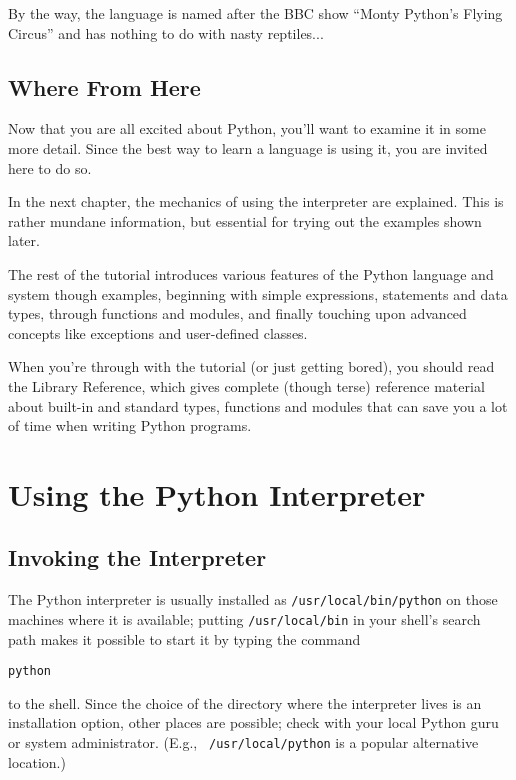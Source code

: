 By the way, the language is named after the BBC show ``Monty
Python's Flying Circus'' and has nothing to do with nasty reptiles...

\section{Where From Here}

Now that you are all excited about Python, you'll want to examine it
in some more detail.  Since the best way to learn a language is
using it, you are invited here to do so.

In the next chapter, the mechanics of using the interpreter are
explained.  This is rather mundane information, but essential for
trying out the examples shown later.

The rest of the tutorial introduces various features of the Python
language and system though examples, beginning with simple
expressions, statements and data types, through functions and modules,
and finally touching upon advanced concepts like exceptions
and user-defined classes.

When you're through with the tutorial (or just getting bored), you
should read the Library Reference, which gives complete (though terse)
reference material about built-in and standard types, functions and
modules that can save you a lot of time when writing Python programs.


\chapter{Using the Python Interpreter}

\section{Invoking the Interpreter}

The Python interpreter is usually installed as {\tt /usr/local/bin/python}
on those machines where it is available; putting {\tt /usr/local/bin} in
your {\UNIX} shell's search path makes it possible to start it by
typing the command

\bcode\begin{verbatim}
python
\end{verbatim}\ecode
%
to the shell.  Since the choice of the directory where the interpreter
lives is an installation option, other places are possible; check with
your local Python guru or system administrator.  (E.g., {\tt
/usr/local/python} is a popular alternative location.)

